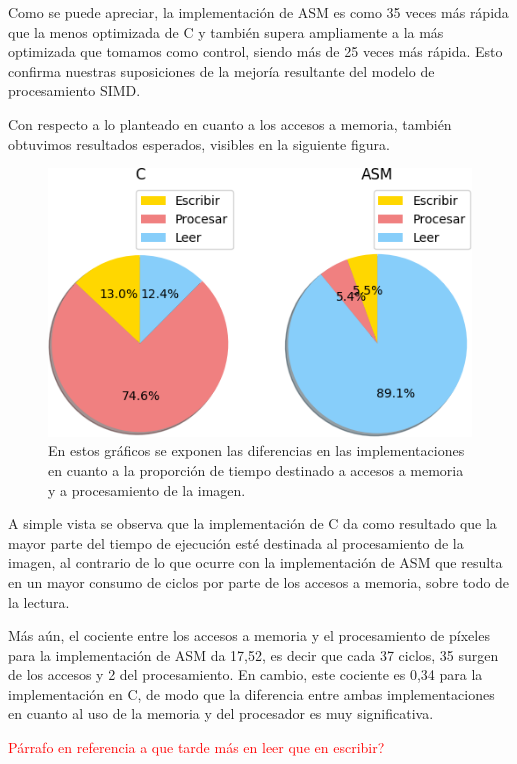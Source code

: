 \par{Como se puede apreciar, la implementación de ASM es como 35 veces más rápida que la menos optimizada de C y también supera ampliamente a la más optimizada que tomamos como control, siendo más de 25 veces más rápida. Esto confirma nuestras suposiciones de la mejoría resultante del modelo de procesamiento SIMD.}

\medskip

\par{Con respecto a lo planteado en cuanto a los accesos a memoria, también obtuvimos resultados esperados, visibles en la siguiente figura.}

\begin{figure}[h!]
\centering
\captionsetup{justification=centering}
	\includegraphics[width = 10 cm, height = 6 cm]{imagenes/CombinarMemoria.png}
\caption[center]{En estos gráficos se exponen las diferencias en las implementaciones en cuanto a la proporción de tiempo destinado a accesos a memoria y a procesamiento de la imagen.}
\end{figure}

\par{A simple vista se observa que la implementación de C da como resultado que la mayor parte del tiempo de ejecución esté destinada al procesamiento de la imagen, al contrario de lo que ocurre con la implementación de ASM que resulta en un mayor consumo de ciclos por parte de los accesos a memoria, sobre todo de la lectura.}
\par{Más aún, el cociente entre los accesos a memoria y el procesamiento de píxeles para la implementación de ASM da 17,52, es decir que cada 37 ciclos, 35 surgen de los accesos y 2 del procesamiento. En cambio, este cociente es 0,34 para la implementación en C, de modo que la diferencia entre ambas implementaciones en cuanto al uso de la memoria y del procesador es muy significativa.}
\par{\textcolor{red}{Párrafo en referencia a que tarde más en leer que en escribir?}}